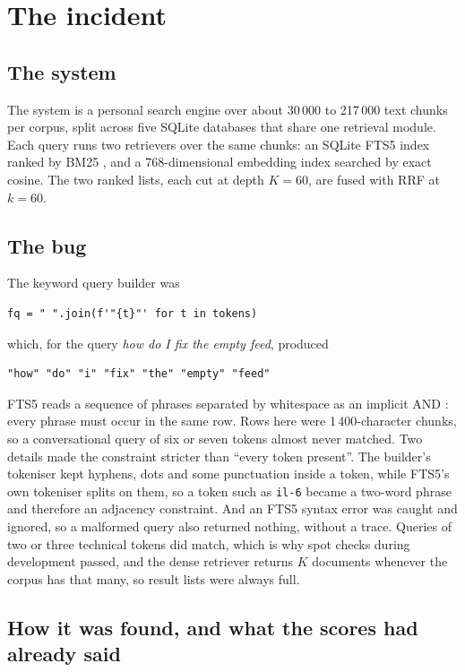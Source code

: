 \documentclass[11pt]{article}
\begin{document}
\section{The incident}
\label{sec:incident}

\subsection{The system}

The system is a personal search engine over about 30\,000 to 217\,000 text chunks per corpus, split across five SQLite databases that share one retrieval module. Each query runs two retrievers over the same chunks: an SQLite FTS5 index ranked by BM25 \citep{robertson2009bm25,sqlite_fts5}, and a 768-dimensional embedding index searched by exact cosine. The two ranked lists, each cut at depth $K = 60$, are fused with RRF at $k = 60$.

\subsection{The bug}
\label{sec:bug}

The keyword query builder was
\begin{verbatim}
fq = " ".join(f'"{t}"' for t in tokens)
\end{verbatim}
which, for the query \emph{how do I fix the empty feed}, produced
\begin{verbatim}
"how" "do" "i" "fix" "the" "empty" "feed"
\end{verbatim}
FTS5 reads a sequence of phrases separated by whitespace as an implicit AND \citep[\S 3]{sqlite_fts5}: every phrase must occur in the same row. Rows here were 1\,400-character chunks, so a conversational query of six or seven tokens almost never matched. Two details made the constraint stricter than ``every token present''. The builder's tokeniser kept hyphens, dots and some punctuation inside a token, while FTS5's own tokeniser splits on them, so a token such as \texttt{il-6} became a two-word phrase and therefore an adjacency constraint. And an FTS5 syntax error was caught and ignored, so a malformed query also returned nothing, without a trace. Queries of two or three technical tokens did match, which is why spot checks during development passed, and the dense retriever returns $K$ documents whenever the corpus has that many, so result lists were always full.

\subsection{How it was found, and what the scores had already said}
\label{sec:found}
\end{document}
